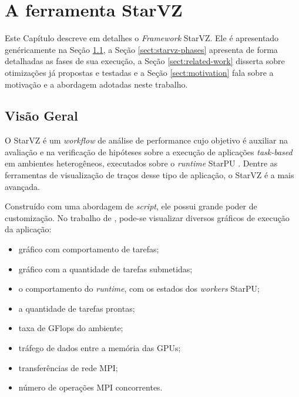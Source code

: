 \chapter{A ferramenta StarVZ} \label{ch:starvz}

Este Capítulo descreve em detalhes o \emph{Framework} StarVZ. Ele é 
apresentado genéricamente na Seção \ref{sect:starvz-overview}, a Seção 
\ref{sect:starvz-phases} apresenta de forma detalhadas as fases de sua 
execução, a Seção \ref{sect:related-work} disserta sobre otimizações já 
propostas e testadas e a Seção \ref{sect:motivation} fala sobre a motivação e a 
abordagem adotadas neste trabalho.

\section{Visão Geral}\label{sect:starvz-overview}

O StarVZ \cite{ref:starvz} é um \emph{workflow} de análise de performance cujo 
objetivo é auxiliar na avaliação e na verificação de hipóteses sobre a execução 
de aplicações \emph{task-based} em ambientes heterogêneos, executados sobre o
\emph{runtime} StarPU \cite{ref:starpu}. Dentre as ferramentas de visualização
de traços desse tipo de aplicação, o StarVZ é a mais avançada. 

Construído com uma abordagem de \textit{script}, ele possui grande poder de customização.
No trabalho de \citet{ref:starvz}, pode-se visualizar diversos gráficos de execução da aplicação:

\begin{itemize}
    \item gráfico com comportamento de tarefas;
    \item gráfico com a quantidade de tarefas submetidas;
    \item o comportamento do \emph{runtime}, com os estados dos \emph{workers} StarPU;
    \item a quantidade de tarefas prontas;
    \item taxa de GFlops do ambiente;
    \item tráfego de dados entre a memória das GPUs;
    \item transferências de rede MPI;
    \item número de operações MPI concorrentes.
\end{itemize}

